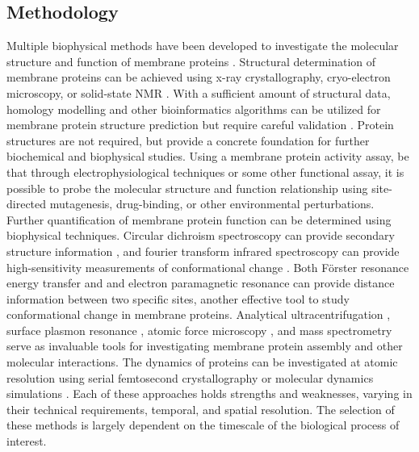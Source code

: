  \begin{refsection}
 \chapter{Methodology}

Multiple biophysical methods have been developed to investigate the molecular structure and function of membrane proteins \cite{Cournia:2015df,PebayPeyroula:2008wv}. Structural determination of membrane proteins can be achieved using x-ray crystallography, cryo-electron microscopy, or solid-state NMR \cite{Lacapere:2010fl}. With a sufficient amount of structural data, homology modelling and other bioinformatics algorithms can be utilized for membrane protein structure prediction but require careful validation \cite{Almeida:2017kq,Stansfeld:2017dk}. Protein structures are not required, but provide a concrete foundation for further biochemical and biophysical studies. Using a membrane protein activity assay, be that through electrophysiological techniques \cite{Rettinger:2016uc} or some other functional assay, it is possible to probe the molecular structure and function relationship using site-directed mutagenesis, drug-binding, or other environmental perturbations. Further quantification of membrane protein function can be determined using biophysical techniques. Circular dichroism spectroscopy can provide secondary structure information \cite{Miles:2016ks}, and fourier transform infrared spectroscopy can provide high-sensitivity measurements of conformational change \cite{Tatulian:2013hy}. Both F\"{o}rster resonance energy transfer \cite{Loura:2011ig} and and electron paramagnetic resonance \cite{Sahu:2015kd} can provide distance information between two specific sites, another effective tool to study conformational change in membrane proteins. Analytical ultracentrifugation \cite{Fleming:2016hi}, surface plasmon resonance \cite{Patching:2014bg}, atomic force microscopy \cite{Whited:2014hb}, and mass spectrometry \cite{Landreh:2014fs} serve as invaluable tools for investigating membrane protein assembly and other molecular interactions. The dynamics of proteins can be investigated at atomic resolution using serial femtosecond crystallography \cite{Zhu:2016cp} or molecular dynamics simulations \cite{Dror:2012cs,Chavent:2016cq}. Each of these approaches holds strengths and weaknesses, varying in their technical requirements, temporal, and spatial resolution. The selection of these methods is largely dependent on the timescale of the biological process of interest.


\end{refsection}
